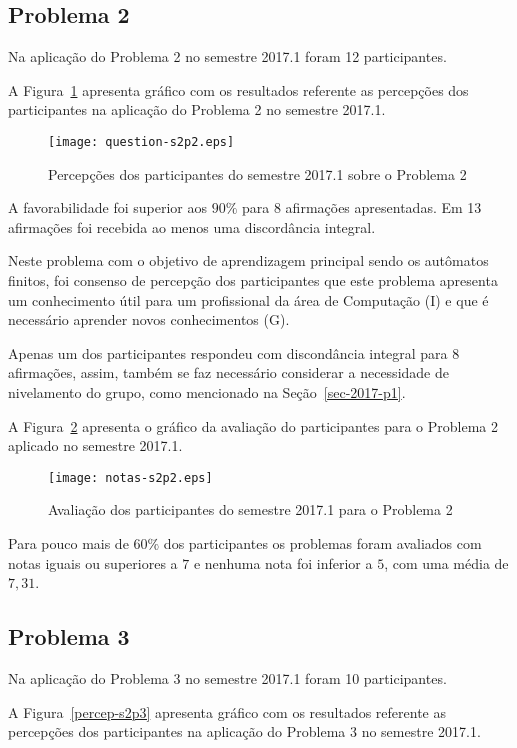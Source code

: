 \subsection{Problema 2}
Na aplicação do Problema 2 no semestre 2017.1 foram 12 participantes.

A Figura~\ref{percep-s2p2} apresenta gráfico com os resultados referente
as percepções dos participantes na aplicação do
Problema 2 no semestre 2017.1.

\begin{figure}[!htb]
\centering
\texttt{[image: question-s2p2.eps]}
\caption{Percepções dos participantes do semestre 2017.1 sobre o Problema 2}
\label{percep-s2p2}
\end{figure}

A favorabilidade foi superior aos $90\%$ para 8 afirmações apresentadas.
Em 13 afirmações foi recebida ao menos uma discordância integral.

Neste problema com o objetivo de aprendizagem principal sendo
os autômatos finitos, foi consenso de percepção dos participantes que
este problema apresenta um conhecimento útil para um profissional
da área de Computação (I) e que é necessário aprender novos
conhecimentos (G).

Apenas um dos participantes respondeu com discondância integral para
8 afirmações, assim, também se faz necessário considerar a
necessidade de nivelamento do grupo, como mencionado
na Seção~\ref{sec-2017-p1}.

A Figura~\ref{aval-s2p2} apresenta o gráfico da
avaliação do participantes para o Problema 2 aplicado no semestre 2017.1.

\begin{figure}[!htb]
\centering
\texttt{[image: notas-s2p2.eps]}
\caption{Avaliação dos participantes do semestre 2017.1 para o Problema 2}
\label{aval-s2p2}
\end{figure}

Para pouco mais de $60\%$ dos participantes os problemas foram
avaliados com notas iguais ou superiores a $7$ e nenhuma nota
foi inferior a $5$, com uma média de $7,31$.

\subsection{Problema 3}
Na aplicação do Problema 3 no semestre 2017.1 foram 10 participantes.

A Figura~\ref{percep-s2p3} apresenta gráfico com os resultados referente
as percepções dos participantes na aplicação do
Problema 3 no semestre 2017.1.

